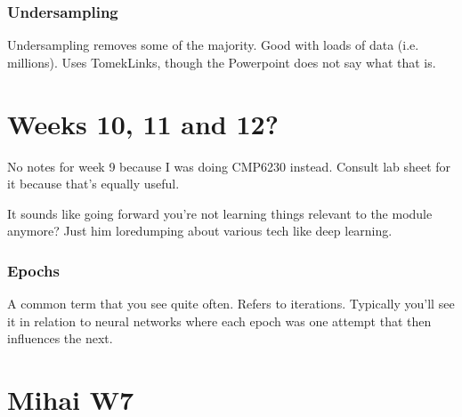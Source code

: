 \documentclass[12pt]{report}
\begin{document}
\subsubsection{Undersampling}
Undersampling removes some of the majority. Good with loads of data (i.e. millions).
Uses TomekLinks, though the Powerpoint does not say what that is.

\section{Weeks 10, 11 and 12?}
No notes for week 9 because I was doing CMP6230 instead. Consult lab sheet for it because that's equally useful.

It sounds like going forward you're not learning things relevant to the module anymore? Just him loredumping about various 
tech like deep learning.

\subsubsection{Epochs}
A common term that you see quite often. Refers to iterations. Typically you'll see it in relation to neural networks 
where each epoch was one attempt that then influences the next.

\section{Mihai W7}
\end{document}
